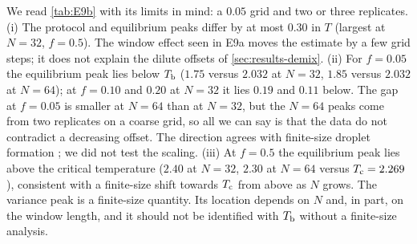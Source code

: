 We read \cref{tab:E9b} with its limits in mind: a $0.05$ grid and two or three replicates.
(i) The protocol and equilibrium peaks differ by at most $0.30$ in $T$ (largest at $N=32$, $f=0.5$). The window effect seen in E9a moves the estimate by a few grid steps; it does not explain the dilute offsets of \cref{sec:results-demix}.
(ii) For $f=0.05$ the equilibrium peak lies below $T_{\mathrm b}$ ($1.75$ versus $2.032$ at $N=32$, $1.85$ versus $2.032$ at $N=64$); at $f=0.10$ and $0.20$ at $N=32$ it lies $0.19$ and $0.11$ below. The gap at $f=0.05$ is smaller at $N=64$ than at $N=32$, but the $N=64$ peaks come from two replicates on a coarse grid, so all we can say is that the data do not contradict a decreasing offset. The direction agrees with finite-size droplet formation \citep{binder1987,biskup2002}; we did not test the scaling.
(iii) At $f=0.5$ the equilibrium peak lies above the critical temperature ($2.40$ at $N=32$, $2.30$ at $N=64$ versus $T_{\mathrm c}=2.269$), consistent with a finite-size shift towards $T_{\mathrm c}$ from above as $N$ grows.
The variance peak is a finite-size quantity. Its location depends on $N$ and, in part, on the window length, and it should not be identified with $T_{\mathrm b}$ without a finite-size analysis.
